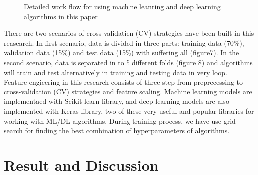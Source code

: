\documentclass[english]{article}
\begin{document}
\begin{figure}[H]
\caption{Detailed work flow for using machine leanring and deep learning algorithms in this paper}
\end{figure}


There are two scenarios of cross-validation (CV) strategies have been built in this reasearch. In first scenario, data is divided in three parts: training data (70\%), validation data (15\%) and test data (15\%) with suffering all (figure7). In the second scenario, data is separated in to 5 different folds (figure 8) and algorithms will train and test alternatively in training and testing data in very loop.\\
Feature engieering in this research consists of three step from preprecessing to cross-validation (CV) strategies and feature scaling. Machine learning models are implementaed with Scikit-learn library, and deep learning models are also implemented with Keras library, two of these very useful and popular libraries for working with ML/DL algorithms. During training process, we have use grid search for finding the best combination of hyperparameters of algorithms.

\section{Result and Discussion}
\end{document}
